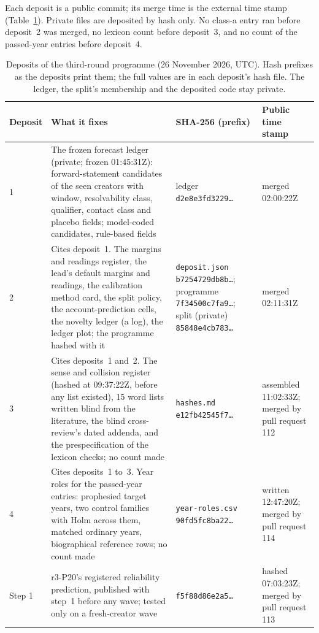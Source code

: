Each deposit is a public commit; its merge time is the external time stamp (Table~\ref{tab:panel3-deposits}). Private
files are deposited by hash only. No class-a entry ran before deposit~2 was merged, no lexicon count before deposit~3,
and no count of the passed-year entries before deposit~4.

\begin{table}[tp]
\centering
\footnotesize
\begin{tabular}{@{}p{}p{}p{}p{}@{}}
\toprule
Deposit & What it fixes & SHA-256 (prefix) & Public time stamp \\
\midrule
1 & The frozen forecast ledger (private; frozen 01:45:31Z): forward-statement candidates of the seen creators with
window, resolvability class, qualifier, contact class and placebo fields; model-coded candidates, rule-based fields &
ledger \texttt{d2e8e3fd3229\ldots} & merged 02:00:22Z \\
2 & Cites deposit~1. The margins and readings register, the lead's default margins and readings, the calibration
method card, the split policy, the account-prediction cells, the novelty ledger (a log), the ledger plot; the programme
hashed with it & \texttt{deposit.json} \texttt{b7254729db8b\ldots}; programme \texttt{7f34500c7fa9\ldots}; split
(private) \texttt{85848e4cb783\ldots} & merged 02:11:31Z \\
3 & Cites deposits~1 and~2. The sense and collision register (hashed at 09:37:22Z, before any list existed), 15 word lists written blind
from the literature, the blind cross-review's dated addenda, and the prespecification of the lexicon checks; no count
made & \texttt{hashes.md} \texttt{e12fb42545f7\ldots} & assembled 11:02:33Z; merged by pull request 112 \\
4 & Cites deposits~1 to~3. Year roles for the passed-year entries: prophesied target years, two control families with
Holm across them, matched ordinary years, biographical reference rows; no count made & \texttt{year-roles.csv}
\texttt{90fd5fc8ba22\ldots} & written 12:47:20Z; merged by pull request 114 \\
\midrule
Step 1 & r3-P20's registered reliability prediction, published with step~1 before any wave; tested only on a
fresh-creator wave & \texttt{f5f88d86e2a5\ldots} & hashed 07:03:23Z; merged by pull request 113 \\
\bottomrule
\end{tabular}
\caption{Deposits of the third-round programme (26 November 2026, UTC). Hash prefixes as the deposits print them; the
full values are in each deposit's hash file. The ledger, the split's membership and the deposited code stay private.}
\label{tab:panel3-deposits}
\end{table}

